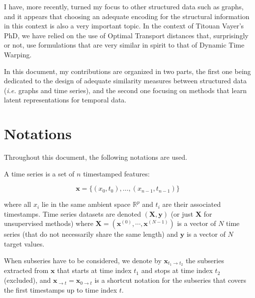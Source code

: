 I have, more recently, turned my focus to other structured data such as graphs,
and it appears that choosing an adequate encoding for the structural information
in this context is also a very important topic.
In the context of Titouan Vayer's PhD, we have relied on the use of Optimal
Transport distances that, surprisingly
or not, use formulations that are very similar in spirit to that of
Dynamic Time Warping.

In this document, my contributions are organized in two
parts, the first one being dedicated to the design of adequate similarity
measures between structured data (\emph{i.e.} graphs and time series), and the
second one focusing on methods that
learn latent representations for temporal data.

\section*{Notations}

Throughout this document, the following notations are used.

A time series is a set of $n$ timestamped features:

\begin{equation}
    \mathbf{x} = \{ (x_0, t_0), \dots , (x_{n-1}, t_{n-1}) \}
\end{equation}

where all $x_i$ lie in the same ambient space $\mathbb{R}^{p}$ and $t_i$ are
their associated timestamps.
Time series datasets are denoted $(\mathbf{X}, \mathbf{y})$ (or just
$\mathbf{X}$ for unsupervised methods) where
$\mathbf{X} = \left( \mathbf{x}^{(0)}, \cdots, \mathbf{x}^{(N-1)} \right)$ is
a vector of $N$ time series (that do not necessarily share the same length) and
$\mathbf{y}$ is a vector of $N$ target values.

When subseries have to be considered, we denote by
$\mathbf{x}_{t_1 \rightarrow t_2}$ the subseries extracted from $\mathbf{x}$
that starts at time index $t_1$ and stops at time index $t_2$ (excluded), and
$\mathbf{x}_{\rightarrow t} = \mathbf{x}_{0 \rightarrow t}$ is a shortcut
notation for the subseries that covers the first timestamps up to time index
$t$.
